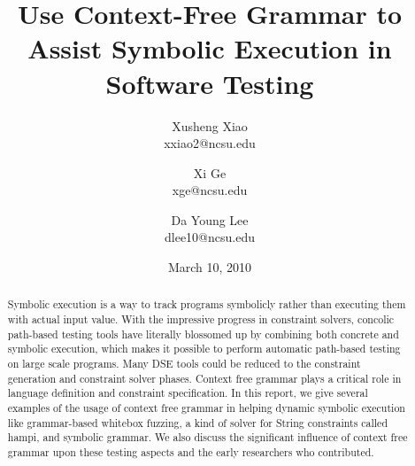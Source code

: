 \documentclass[times, 10pt,onecolumn]{article}
\title{Use Context-Free Grammar to Assist Symbolic Execution in Software Testing}
\author{
Xusheng Xiao\\
\small{xxiao2@ncsu.edu}\\
\and
Xi Ge\\
\small{xge@ncsu.edu}\\
\and
Da Young Lee\\
\small{dlee10@ncsu.edu}
}
\date{March 10, 2010}
\begin{document}
\maketitle


\begin{abstract}
Symbolic execution is a way to track programs symbolicly rather than executing them with actual input value. With the impressive progress in constraint solvers, concolic path-based testing tools have literally blossomed up by combining both concrete and symbolic execution, which makes it possible to perform automatic path-based testing on large scale programs.
Many DSE tools could be reduced to the constraint generation and constraint solver phases. Context free grammar plays a critical role in language definition and constraint specification. In this report, we give several examples of the usage of context free grammar in helping dynamic symbolic execution like grammar-based whitebox fuzzing, a kind of solver for String constraints called hampi, and symbolic grammar. We also discuss the significant influence of context free grammar upon these testing aspects and the early researchers who contributed. 
\end{abstract}













\end{document}
